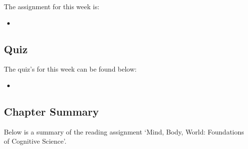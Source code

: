The assignment for this week is:

\begin{itemize}
    \item {}
\end{itemize}

\subsection{Quiz}

The quiz's for this week can be found below:

\begin{itemize}
    \item {}
\end{itemize}

\newpage

\subsection{Chapter Summary}

Below is a summary of the reading assignment `Mind, Body, World: Foundations of Cognitive Science'.

